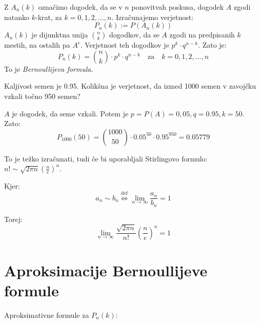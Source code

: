 \documentclass[12pt]{book}
\def\n{\noindent}
\theoremstyle{definition}
\theoremstyle{plain}
\theoremstyle{plain}
\theoremstyle{plain}
\theoremstyle{remark}
\begin{document}
\n Z $A_n(k)$ označimo dogodek, da se v $n$ ponovitvah poskusa, dogodek $A$ zgodi natanko $k$-krat, za $k=0, 1, 2, \ldots , n$. Izračunajemo verjetnost:
$$
P_n(k):=P\left(A_n(k)\right)
$$
$A_n(k)$ je dijunktna unija $\binom{n}{k}$ dogodkov, da se $A$ zgodi na predpisanih $k$ mestih, na ostalih pa $A^c$. Verjetnost teh dogodkov je $p^k \cdot q^{n-k}$. Zato je: 
$$
P_n(k) = \binom{n}{k} \cdot p^k \cdot q^{n-k} \quad \text{za} \quad k=0, 1, 2, \ldots , n
$$
To je \emph{Bernoullijeva formula}.

\begin{zgled}
    Kaljivost semen je 0.95. Kolikšna je verjetnost, da izmed 1000 semen v zavojčku vzkali točno 950 semen?

    $A$ je dogodek, da seme vzkali. Potem je $p=P(A)=0,05, q=0.95, k=50$. Zato: 
    $$
    P_{1000}(50) = \binom{1000}{50}\cdot 0.05^{50} \cdot 0.95^{950} = 0.05779
    $$
\end{zgled}

\n To je težko izračunati, tudi če bi uporabljali Stirlingovo formulo: $n! \sim \sqrt{2 \pi n} \left(\frac{n}{e}\right)^n$.

Kjer: 
$$
a_n \sim b_n \overset{\text{def}}{\iff} \lim_{n \to \infty} \frac{a_n}{b_n} = 1
$$

Torej:
$$
\lim _{n \to \infty} \frac{\sqrt{2 \pi n}}{n !}\left(\frac{n}{e}\right)^n=1
$$

\section{Aproksimacije Bernoullijeve formule}

\n Aproksimativne formule za $P_n(k)$:
\end{document}
